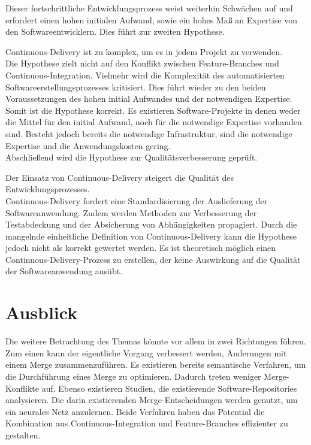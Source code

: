 Dieser fortschrittliche Entwicklungsprozess weist weiterhin Schwächen auf und erfordert einen hohen initialen Aufwand, sowie ein hohes Maß an Expertise von den Softwareentwicklern. Dies führt zur zweiten Hypothese. 

\glqq Continuous-Delivery ist zu komplex, um es in jedem Projekt zu verwenden.\grqq{}
\\
Die Hypothese zielt nicht auf den Konflikt zwischen Feature-Branches und Continuous-Integration. Vielmehr wird die Komplexität des automatisierten Softwareerstellungsprozesses kritisiert. Dies führt wieder zu den beiden Voraussetzungen des hohen initial Aufwandes und der notwendigen Expertise. Somit ist die Hypothese korrekt. Es existieren Software-Projekte in denen weder die Mittel für den initial Aufwand, noch für die notwendige Expertise vorhanden sind. Besteht jedoch bereits die notwendige Infrastruktur, sind die notwendige Expertise und die Anwendungskosten gering. 
\\
Abschließend wird die Hypothese zur Qualitätsverbesserung geprüft.

\glqq Der Einsatz von Continuous-Delivery steigert die Qualität des Entwicklungsprozesses.\grqq{}
\\
Continuous-Delivery fordert eine Standardisierung der Auslieferung der Softwareanwendung. Zudem werden Methoden zur Verbesserung der Testabdeckung und der Absicherung von Abhängigkeiten propagiert. Durch die mangelnde einheitliche Definition von Continuous-Delivery kann die Hypothese jedoch nicht als korrekt gewertet werden. Es ist theoretisch möglich einen Continuous-Delivery-Prozess zu erstellen, der keine Auswirkung auf die Qualität der Softwareanwendung ausübt.

\section{Ausblick}

Die weitere Betrachtung des Themas könnte vor allem in zwei Richtungen führen. Zum einen kann der eigentliche Vorgang verbessert werden, Änderungen mit einem Merge zusammenzuführen. Es existieren bereits semantische Verfahren, um die Durchführung eines Merge zu optimieren. Dadurch treten weniger Merge-Konflikte auf. Ebenso existieren Studien, die existierende Software-Repositories analysieren. Die darin existierenden Merge-Entscheidungen werden genutzt, um ein neurales Netz anzulernen. Beide Verfahren haben das Potential die Kombination aus Continuous-Integration und Feature-Branches effizienter zu gestalten.

